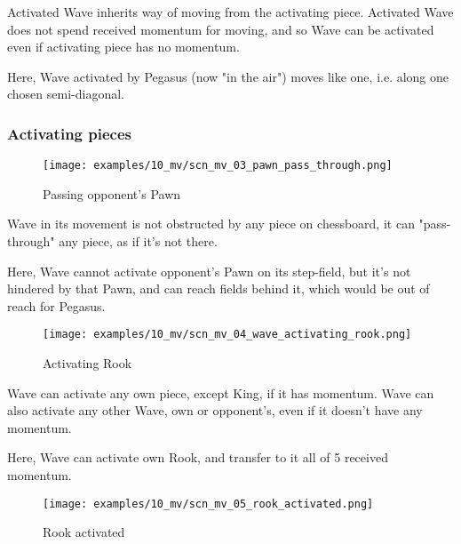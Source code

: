 Activated Wave inherits way of moving from the activating piece. Activated Wave
does not spend received momentum for moving, and so Wave can be activated even if
activating piece has no momentum.

Here, Wave activated by Pegasus (now "in the air") moves like one, i.e. along one
chosen semi-diagonal.

\clearpage %

\subsubsection*{Activating pieces}

\vspace*{-1.4\baselineskip}
\noindent
\begin{figure}[!h]
\texttt{[image: examples/10\_mv/scn\_mv\_03\_pawn\_pass\_through.png]}
\caption{Passing opponent's Pawn}
\label{fig:scn_mv_03_pawn_pass_through}
\end{figure}

Wave in its movement is not obstructed by any piece on chessboard, it can
"pass-through" any piece, as if it's not there.

Here, Wave cannot activate opponent's Pawn on its step-field, but it's not
hindered by that Pawn, and can reach fields behind it, which would be out of
reach for Pegasus.

\clearpage %

\vspace*{-2.1\baselineskip}
\noindent
\begin{figure}[!h]
\texttt{[image: examples/10\_mv/scn\_mv\_04\_wave\_activating\_rook.png]}
\caption{Activating Rook}
\label{fig:scn_mv_04_wave_activating_rook}
\end{figure}

Wave can activate any own piece, except King, if it has momentum. Wave can also
activate any other Wave, own or opponent's, even if it doesn't have any momentum.

Here, Wave can activate own Rook, and transfer to it all of 5 received momentum.

\clearpage %

\vspace*{-2.1\baselineskip}
\noindent
\begin{figure}[!h]
\texttt{[image: examples/10\_mv/scn\_mv\_05\_rook\_activated.png]}
\caption{Rook activated}
\label{fig:scn_mv_05_rook_activated}
\end{figure}

